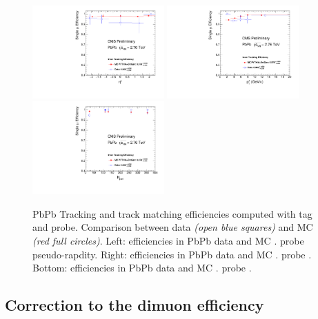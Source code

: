 \begin{figure}
  \begin{center}
    \includegraphics[width=0.45\textwidth]{Chapters/aCorrection/Trk_Comp_HI_eta_RD_MC.pdf}
    \includegraphics[width=0.45\textwidth]{Chapters/aCorrection/Trk_Comp_HI_pt_RD_MC.pdf}
    \includegraphics[width=0.45\textwidth]{Chapters/aCorrection/Trk_Comp_HI_CNT_RD_MC.pdf}
    \caption{
      PbPb Tracking and track matching efficiencies computed with tag and
      probe. Comparison between data \emph{(open blue squares)} and MC
      \emph{(red full circles)}.
      Left: efficiencies in PbPb data and MC \vs. probe pseudo-rapdity.
      Right: efficiencies in PbPb data and MC \vs. probe \pt.
      Bottom: efficiencies in PbPb data and MC \vs. probe \pt.
    }
    \label{fig:trk_eff_HI}
  \end{center}
\end{figure}



\subsection{Correction to the dimuon efficiency}
\label{sec:tnp_dimueff}

